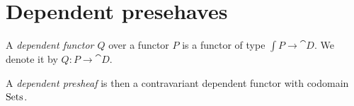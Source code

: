 \section{Dependent presehaves}

\begin{definition}
  A \emph{dependent functor \(Q\)} over a functor \(P\) is a functor of type \(\int P → \cat D\).
  We denote it by \(Q : P → \cat D\).

  A \emph{dependent presheaf} is then a contravariant dependent functor with codomain \(\mathrm{Sets}\).
\end{definition}

